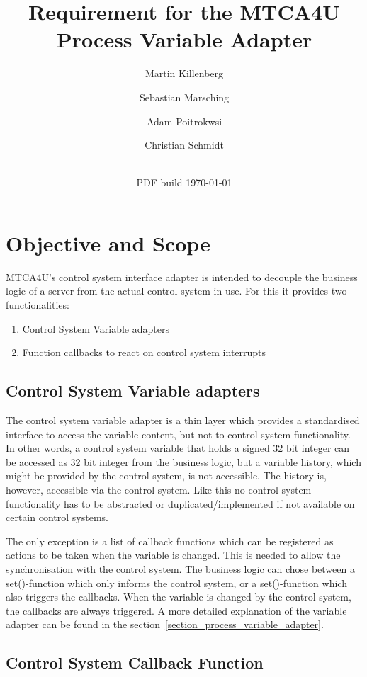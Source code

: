 \documentclass[11pt,a4paper]{scrartcl}
\title{Requirement for the MTCA4U Process Variable Adapter}
\date{\svnrevision\\ PDF build \today}
\author[1]{Martin Killenberg} \author[2]{Sebastian Marsching}
\author[3]{Adam Poitrokwsi}
\author[1]{Christian Schmidt}
\affil[1]{Deutsches Elektronen-Synchrotron DESY, Hamburg, Germany}
\affil[2]{aquenos GmbH, Baden-Baden, Germany}
\affil[3]{FastLogic Sp.\ z o.\ o., \L\'od\'z, Poland}
\begin{document}
\maketitle
\section{Objective and Scope}

MTCA4U's control system interface adapter is intended to decouple the business
logic of a server from the actual control system in use. For this it provides
two functionalities: 
\begin{enumerate}
  \item Control System Variable adapters
  \item Function callbacks to react on control system interrupts
\end{enumerate}

\subsection{Control System Variable adapters}

The control system variable adapter is a thin layer which provides a
standardised interface to access the variable content, but not to control
system functionality. In other words, a control system variable that holds a
signed 32 bit integer can be accessed as 32 bit integer from the business
logic, but a variable history, which might be provided by the control system,
is not accessible. The history is, however, accessible via the control
system. Like this no control system functionality has to be abstracted or
duplicated/implemented if not available on certain control systems. 

The only exception is a list of callback functions which can be registered as
actions to be taken when the variable is changed. This is needed to allow the
synchronisation with the control system. The business logic can chose between
a set()-function which only informs the control system, or a set()-function
which also triggers the callbacks. When the variable is changed by the control
system, the callbacks are always triggered. A more detailed explanation of the
variable adapter can be found in the
section~\ref{section_process_variable_adapter}. 

\subsection{Control System Callback Function}
\end{document}
